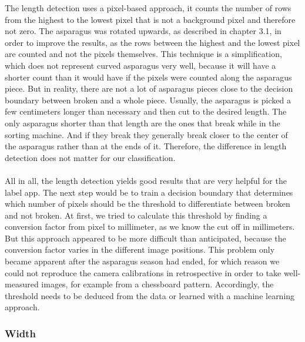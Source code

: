The length detection uses a pixel-based approach, it counts the number of rows from the highest to the lowest pixel that is not a background pixel and therefore not zero. The asparagus was rotated upwards, as described in chapter 3.1, in order to improve the results, as the rows between the highest and the lowest pixel are counted and not the pixels themselves. This technique is a simplification, which does not represent curved asparagus very well, because it will have a shorter count than it would have if the pixels were counted along the asparagus piece. But in reality, there are not a lot of asparagus pieces close to the decision boundary between broken and a whole piece. Usually, the asparagus is picked a few centimeters longer than necessary and then cut to the desired length. The only asparagus shorter than that length are the ones that break while in the sorting machine. And if they break they generally break closer to the center of the asparagus rather than at the ends of it. Therefore, the difference in length detection does not matter for our classification. \\
\\
All in all, the length detection yields good results that are very helpful for the label app. The next step would be to train a decision boundary that determines which number of pixels should be the threshold to differentiate between broken and not broken. At first, we tried to calculate this threshold by finding a conversion factor from pixel to millimeter, as we know the cut off in millimeters. But this approach appeared to be more difficult than anticipated, because the conversion factor varies in the different image positions. This problem only became apparent after the asparagus season had ended, for which reason we could not reproduce the camera calibrations in retrospective in order to take well-measured images, for example from a chessboard pattern. Accordingly, the threshold needs to be deduced from the data or learned with a machine learning approach.

\subsubsection{Width}

